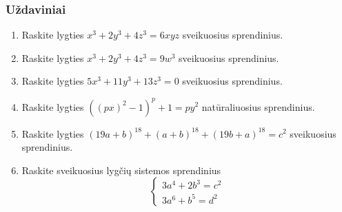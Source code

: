 \subsubsection{Uždaviniai}

\begin{enumerate}
  \item Raskite lygties $x^3 + 2y^3 + 4z^3 = 6xyz$ sveikuosius
    sprendinius.
  \item Raskite lygties $x^3 + 2y^3 + 4z^3 = 9w^3$ sveikuosius
    sprendinius.
  \item Raskite lygties $5x^3 + 11y^3 + 13z^3 = 0$ sveikuosius sprendinius.
  \item Raskite lygties $( (px)^2 -1)^p + 1 = py^2$ natūraliuosius
    sprendinius.
  \item \text{[Austria 2002]} Raskite lygties $(19a + b)^{18} + (a+b)^{18} + (19b + a)^{18} =
    c^2$ sveikuosius sprendinius.
  \item Raskite sveikuosius lygčių sistemos sprendinius 
    $$\left\{ 
    \begin{array}{l} 3a^4 + 2b^3 = c^2 \\
      3a^6 + b^5 = d^2
    \end{array}\right.$$



\end{enumerate}
